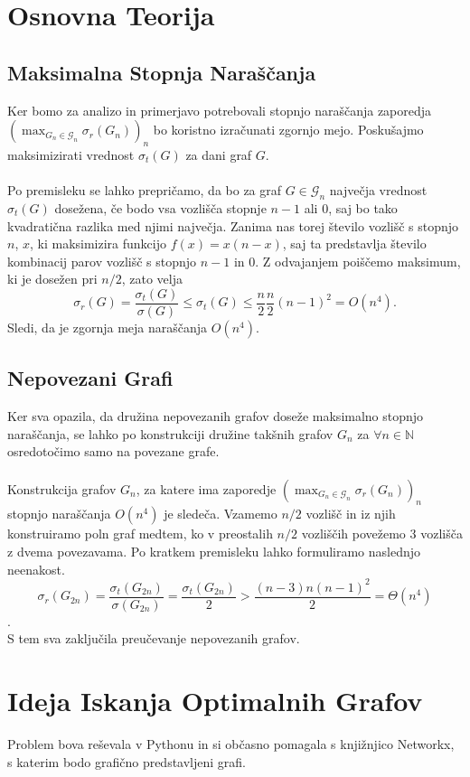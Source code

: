 \documentclass[ letterpaper, titlepage, fleqn]{article}
\begin{document}
\section{Osnovna Teorija}

\subsection{Maksimalna Stopnja Naraščanja}
Ker bomo za analizo in primerjavo potrebovali stopnjo naraščanja
zaporedja $(\max_{G_n \in \mathscr{G}_n} \sigma_r(G_n))_n$ bo koristno izračunati zgornjo mejo.
Poskušajmo maksimizirati vrednost $\sigma_t(G)$ za dani graf $G$.
\\\\
Po premisleku se lahko prepričamo, da bo za graf $G \in \mathscr{G}_n$ največja vrednost $\sigma_t(G)$ dosežena, če
bodo vsa vozlišča stopnje $n - 1$ ali $0$, saj bo tako kvadratična razlika med njimi največja.
Zanima nas torej število vozlišč s stopnjo $n$, $x$, ki maksimizira funkcijo
$f(x) = x (n - x)$, saj ta predstavlja število kombinacij parov vozlišč s stopnjo $n - 1$ in $0$.
Z odvajanjem poiščemo maksimum, ki je dosežen pri $n / 2$, zato velja
$$
\sigma_r(G) = \frac{\sigma_t(G)}{\sigma(G)} 
\leq \sigma_t(G) \leq \frac{n}{2} \frac{n}{2} (n - 1)^2 
= O(n^4).
$$
Sledi, da je zgornja meja naraščanja $O(n^4)$.

\subsection{Nepovezani Grafi}
Ker sva opazila, da družina nepovezanih grafov doseže maksimalno stopnjo naraščanja,
se lahko po konstrukciji družine takšnih grafov $G_n$ za $\forall n \in \mathbb{N}$
osredotočimo samo na povezane grafe.
\\\\
Konstrukcija grafov $G_n$, za katere ima zaporedje  $(\max_{G_n \in \mathscr{G}_n} \sigma_r(G_n))_n$  stopnjo 
naraščanja $O(n^4)$ je sledeča.
Vzamemo $n / 2$ vozlišč in iz njih konstruiramo poln graf
medtem, ko v preostalih $n /2$ vozliščih povežemo 3 vozlišča z dvema povezavama.
Po kratkem premisleku lahko formuliramo naslednjo neenakost.
$$\sigma_r(G_{2n}) = \frac{\sigma_t(G_{2n})}{\sigma(G_{2n})} =  \frac{\sigma_t(G_{2n})}{2}  > \frac{(n - 3) n (n - 1)^2}{2} = \Theta(n^4)$$.
\\
S tem sva zaključila preučevanje nepovezanih grafov.

\section{Ideja Iskanja Optimalnih Grafov}
Problem bova reševala v Pythonu in si občasno pomagala s knjižnjico Networkx,  
s katerim bodo grafično predstavljeni grafi.
\end{document}
